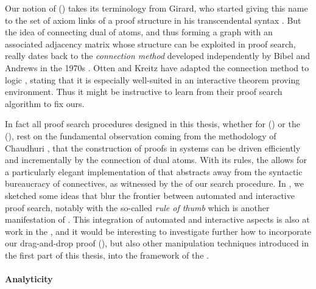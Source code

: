 \begin{scope}
Our notion of \emph{} () takes its terminology from
Girard, who started giving this name to the set of axiom links of a proof
structure in his transcendental syntax . But the idea of connecting dual
 of atoms, and thus forming a graph with an associated adjacency
matrix whose structure can be exploited in proof search, really dates back to
the \emph{connection method} developed independently by Bibel and Andrews in the
1970s . Otten and Kreitz have adapted the connection method
to  logic , stating that it is
especially well-suited in an interactive theorem proving environment. Thus it
might be instructive to learn from their proof search algorithm to fix ours.

In fact all proof search procedures designed in this thesis, whether for  () or the 
(), rest on the fundamental observation coming from the
 methodology of Chaudhuri , that the
construction of proofs in  systems can be driven efficiently and
incrementally by the connection of dual atoms. With its  rules, the
 allows for a particularly elegant implementation of  that abstracts away from the syntactic bureaucracy of 
connectives, as witnessed by the  of our search procedure. In
, we sketched some ideas that blur the frontier
between automated and interactive proof search, notably with the so-called
\emph{rule of thumb} which is another manifestation of . This
integration of automated and interactive aspects is also at work in the , and it would be interesting to investigate further how to incorporate
our drag-and-drop proof  (), but also other 
manipulation techniques introduced in the first part of this thesis, into the
 framework of the .

\paragraph{Analyticity}


\end{scope}
